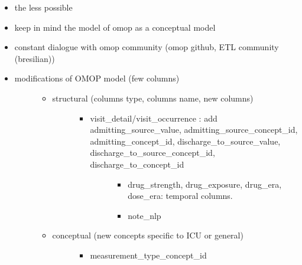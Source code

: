 \begin{itemize}
\item
  the less possible
\item
  keep in mind the model of omop as a conceptual model
\item
  constant dialogue with omop community (omop github, ETL community
  (bresilian))
\item
  \begin{description}
  \item[modifications of OMOP model (few columns)]
  \begin{itemize}
  \item
    \begin{description}
    \item[structural (columns type, columns name, new columns)]
    \begin{itemize}
    \item
      \begin{description}
      \item[visit\_detail/visit\_occurrence : add
      admitting\_source\_value, admitting\_source\_concept\_id,
      admitting\_concept\_id, discharge\_to\_source\_value,
      discharge\_to\_source\_concept\_id, discharge\_to\_concept\_id]
      \begin{itemize}
      \tightlist
      \item
        drug\_strength, drug\_exposure, drug\_era, dose\_era: temporal
        columns.
      \item
        note\_nlp
      \end{itemize}
      \end{description}
    \end{itemize}
    \end{description}
  \item
    \begin{description}
    \item[conceptual (new concepts specific to ICU or general)]
    \begin{itemize}
    \tightlist
    \item
      measurement\_type\_concept\_id
    \end{itemize}


\end{description}
\end{itemize}
\end{description}
\end{itemize}
